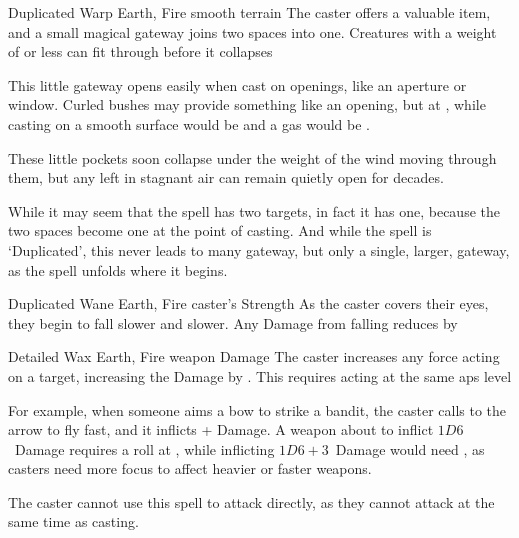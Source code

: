 \ifodd\value{diceNo}

  {Duplicated}%
  {Warp}%
  {Earth, Fire}%
  {smooth terrain}%
  {The caster offers a valuable item, and a small magical gateway joins two spaces into one.
  Creatures with a \gls{weight} of  or less can fit through before it collapses}%
  {This little gateway opens easily when cast on openings, like an aperture or window.
  Curled bushes may provide something like an opening, but at \tn[10], while casting on a smooth surface would be \tn[14] and a gas would be \tn[16].

  These little pockets soon collapse under the weight of the wind moving through them, but any left in stagnant air can remain quietly open for decades.

  While it may seem that the spell has two targets, in fact it has one, because the two spaces become one at the point of casting.
  And while the spell is `Duplicated', this never leads to many gateway, but only a single, larger, gateway, as the spell unfolds where it begins.}

  {Duplicated}%
  {Wane}%
  {Earth, Fire}%
  {caster's Strength}%
  {As the caster covers their eyes, they begin to fall slower and slower.
  Any Damage from falling reduces by }%
  {}

\else

  {Detailed}%
  {Wax}%
  {Earth, Fire}%
  {weapon Damage}%
  {The caster increases any force acting on a target, increasing the Damage by .
  This requires acting at the same \glspl{ap} level}%
  {For example, when someone aims a bow to strike a bandit, the caster calls to the arrow to fly fast, and it inflicts + Damage.
  A weapon about to inflict $1D6$~Damage requires a roll at \tn[7], while  inflicting  $1D6+3$~Damage would need \tn[10], as casters need more focus to affect heavier or faster \glspl{weapon}.

    The caster cannot use this spell to attack directly, as they cannot attack at the same time as casting.}

\fi

